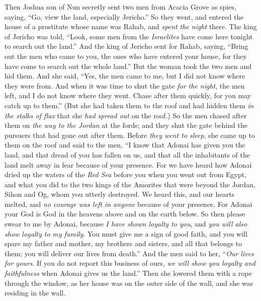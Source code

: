 \begin{biblechapter} %
 Then Joshua son of Nun secretly sent two men from Acacia Grove as spies, saying, “Go, view the land, especially Jericho.” So they went, and entered the house of a prostitute whose name was Rahab, and \textit{spent the night} there.
\verse The king of Jericho was told, “Look, some men from the \textit{Israelites} have come here tonight to search out the land.”
\verse And the king of Jericho sent for Rahab, saying, “Bring out the men who came to you, the ones who have entered your house, for they have come to search out the whole land.”
\verse But the woman took the two men and hid them. And she said, “Yes, the men came to me, but I did not know where they were from.
\verse And when it was time to shut the gate \textit{for the night}, the men left, and I do not know where they went. Chase after them quickly, for you may catch up to them.”
\verse (But she had taken them to the roof and had hidden them \textit{in the stalks of flax} that she \textit{had spread out} on the roof.)
\verse So the men chased after them on \textit{the way to the Jordan} at the fords; and they shut the gate behind the pursuers that had gone out after them.
\verse Before \textit{they went to sleep}, she came up to them on the roof
\verse and said to the men, “I know that Adonai has given you the land, and that dread of you has fallen on us, and that all the inhabitants of the land melt away in fear because of your presence.
\verse For we have heard how Adonai dried up the waters of the \textit{Red Sea} before you when you went out from Egypt, and what you did to the two kings of the Amorites that were beyond the Jordan, Sihon and Og, whom you utterly destroyed.
\verse We heard this, and our hearts melted, and \textit{no courage was left in anyone} because of your presence. For Adonai your God is God in the heavens above and on the earth below.
\verse So then please swear to me by Adonai, because \textit{I have shown loyalty to you}, and \textit{you will also show loyalty} \textit{to my family}. You must give me a sign of good faith,
\verse and you will spare my father and mother, my brothers and sisters, and all that belongs to them; you will deliver our lives from death.”
\verse And the men said to her, “\textit{Our lives for yours}. If you do not report this business of ours, \textit{we will show you loyalty and faithfulness} when Adonai gives us the land.”
\verse Then she lowered them with a rope through the window, as her house was on the outer side of the wall, and she was residing in the wall.

\end{biblechapter}
